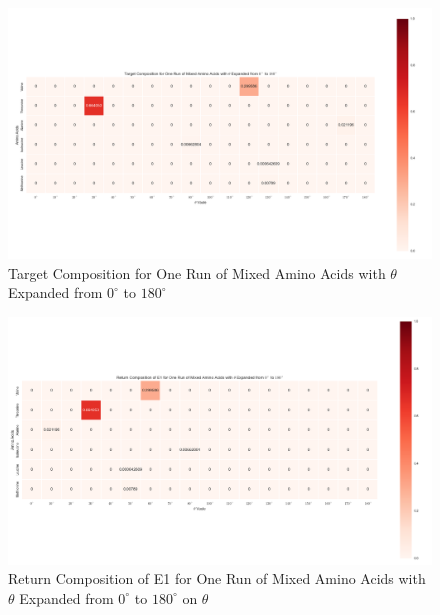\begin{figure}[!ht] \label{fig:5.4}
\centering
\includegraphics[scale=0.4]{Figures/mixture_target_composition_for_one_run_theta_0_180.png}
\caption{Target Composition for One Run of Mixed Amino Acids with $\theta$ Expanded from $0^{\circ}$ to $180^{\circ}$} 
\end{figure}

\begin{figure}[!ht] \label{fig:5.5}
\centering
\includegraphics[scale=0.4]{Figures/mixture_return_composition_of_E1_for_one_run_theta_0_180.png}
\caption{Return Composition of E1 for One Run of Mixed Amino Acids with $\theta$ Expanded from $0^{\circ}$ to $180^{\circ}$ on $\theta$} 
\end{figure}

